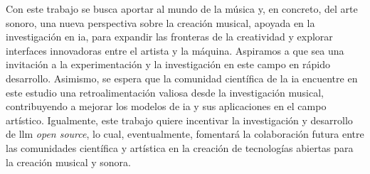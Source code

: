 Con este trabajo se busca aportar al mundo de la música y, en concreto, del arte sonoro, una nueva perspectiva sobre la creación musical, apoyada en la investigación en \gls{ia}, para expandir las fronteras de la creatividad y explorar interfaces innovadoras entre el artista y la máquina. Aspiramos a que sea una invitación a la experimentación y la investigación en este campo en rápido desarrollo. 
Asimismo, se espera que la comunidad científica de la \gls{ia} encuentre en este estudio una retroalimentación valiosa desde la investigación musical, contribuyendo a mejorar los modelos de \gls{ia} y sus aplicaciones en el campo artístico. Igualmente, este trabajo quiere incentivar la investigación y desarrollo de \gls{llm} \emph{open source}, lo cual, eventualmente, fomentará la colaboración futura entre las comunidades científica y artística en la creación de tecnologías abiertas para la creación musical y sonora.